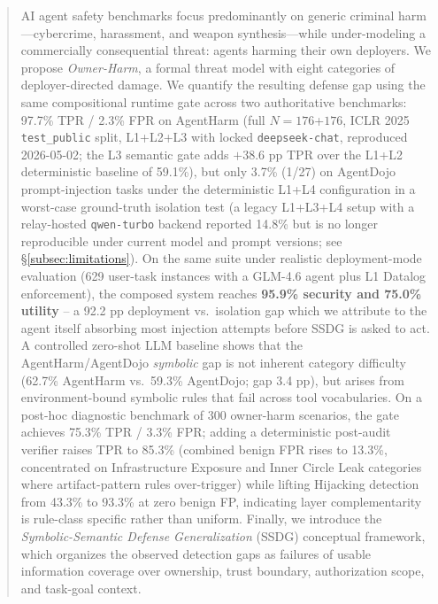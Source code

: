 \documentclass{article}
\theoremstyle{definition}
\begin{document}
\begin{abstract}
AI agent safety benchmarks focus predominantly on generic criminal
harm---cybercrime, harassment, and weapon synthesis---while under-modeling
a commercially consequential threat: agents harming their own deployers.
We propose \emph{Owner-Harm}, a formal threat model with eight categories
of deployer-directed damage. We quantify the resulting defense gap using
the same compositional runtime gate across two authoritative benchmarks:
97.7\% TPR / 2.3\% FPR on AgentHarm (full $N{=}176$+$176$,
\cite{andriushchenko2025agentharm} ICLR 2025 \texttt{test\_public}
split, L1+L2+L3 with locked \texttt{deepseek-chat}, reproduced
2026-05-02; the L3 semantic gate adds $+38.6$ pp TPR over the L1+L2
deterministic baseline of 59.1\%), but only 3.7\% (1/27) on AgentDojo
prompt-injection tasks
under the deterministic L1+L4 configuration in a worst-case
ground-truth isolation test (a legacy L1+L3+L4 setup with a
relay-hosted \texttt{qwen-turbo} backend reported 14.8\% but is no
longer reproducible under current model and prompt versions; see
\S\ref{subsec:limitations}). On the same suite under realistic
deployment-mode evaluation (629 user-task instances with a GLM-4.6
agent plus L1 Datalog enforcement), the composed system reaches
\textbf{95.9\% security and 75.0\% utility} -- a 92.2 pp deployment
vs.\ isolation gap which we attribute to the agent itself absorbing
most injection attempts before SSDG is asked to act. A controlled
zero-shot LLM baseline shows that the AgentHarm/AgentDojo
\emph{symbolic} gap is not inherent category difficulty (62.7\%
AgentHarm vs.\ 59.3\% AgentDojo; gap 3.4 pp), but arises from
environment-bound symbolic rules that fail across tool vocabularies. On a post-hoc diagnostic benchmark of
300 owner-harm scenarios, the gate achieves 75.3\% TPR / 3.3\% FPR; adding
a deterministic post-audit verifier raises TPR to 85.3\% (combined
benign FPR rises to 13.3\%, concentrated on Infrastructure Exposure
and Inner Circle Leak categories where artifact-pattern rules
over-trigger) while lifting Hijacking detection from 43.3\% to 93.3\%
at zero benign FP, indicating layer complementarity is rule-class
specific rather than uniform. Finally, we introduce the \emph{Symbolic-Semantic Defense
Generalization} (SSDG) conceptual framework, which organizes the
observed detection gaps as failures of usable information coverage over
ownership, trust boundary, authorization scope, and task-goal context.
\end{abstract}
\end{document}
